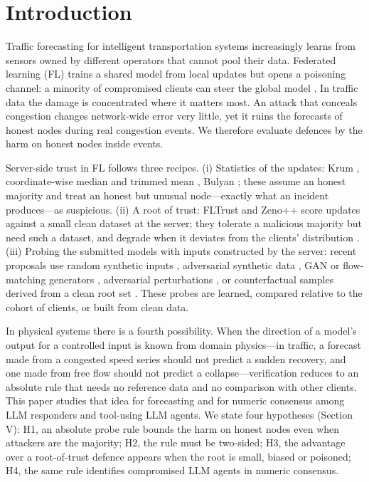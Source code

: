 \documentclass[journal]{IEEEtran}
\begin{document}
\section{Introduction}
Traffic forecasting for intelligent transportation systems increasingly learns from sensors owned by different operators that cannot pool their data. Federated learning (FL) \cite{mcmahan} trains a shared model from local updates but opens a poisoning channel: a minority of compromised clients can steer the global model \cite{survey}. In traffic data the damage is concentrated where it matters most. An attack that conceals congestion changes network-wide error very little, yet it ruins the forecasts of honest nodes during real congestion events. We therefore evaluate defences by the harm on honest nodes inside events.

Server-side trust in FL follows three recipes. (i) Statistics of the updates: Krum \cite{krum}, coordinate-wise median and trimmed mean \cite{yin}, Bulyan \cite{bulyan}; these assume an honest majority and treat an honest but unusual node---exactly what an incident produces---as suspicious. (ii) A root of trust: FLTrust \cite{fltrust} and Zeno++ \cite{zeno} score updates against a small clean dataset at the server; they tolerate a malicious majority but need such a dataset, and degrade when it deviates from the clients' distribution \cite{flest}. (iii) Probing the submitted models with inputs constructed by the server: recent proposals use random synthetic inputs \cite{fedmid}, adversarial synthetic data \cite{danilenka}, GAN or flow-matching generators \cite{zafar,fedfg}, adversarial perturbations \cite{specshield}, or counterfactual samples derived from a clean root set \cite{uav}. These probes are learned, compared relative to the cohort of clients, or built from clean data.

In physical systems there is a fourth possibility. When the direction of a model's output for a controlled input is known from domain physics---in traffic, a forecast made from a congested speed series should not predict a sudden recovery, and one made from free flow should not predict a collapse---verification reduces to an absolute rule that needs no reference data and no comparison with other clients. This paper studies that idea for forecasting and for numeric consensus among LLM responders and tool-using LLM agents. We state four hypotheses (Section V): H1, an absolute probe rule bounds the harm on honest nodes even when attackers are the majority; H2, the rule must be two-sided; H3, the advantage over a root-of-trust defence appears when the root is small, biased or poisoned; H4, the same rule identifies compromised LLM agents in numeric consensus.
\end{document}
